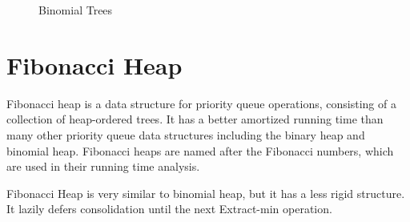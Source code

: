 \documentclass[14pt,a4paper]{report}
\begin{document}
\bigskip

\begin{figure}[H]
    \centering
    
   
    
    \caption{Binomial Trees}
    \label{fig:my_label}
\end{figure}
 
\chapter{Fibonacci Heap}
Fibonacci heap is a data structure for priority queue operations, consisting of a collection of heap-ordered trees. It has a better amortized running time than many other priority queue data structures including the binary heap and binomial heap.  Fibonacci heaps are named after the Fibonacci numbers, which are used in their running time analysis.\par
Fibonacci Heap is very similar to binomial heap, but it has a less rigid structure. It lazily defers consolidation until the next Extract-min operation.
\end{document}

